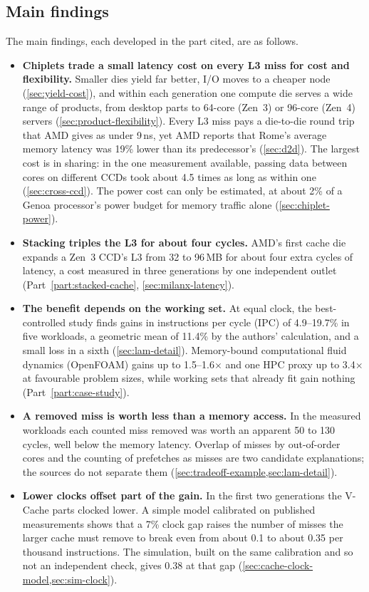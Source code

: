 \subsection{Main findings}
\label{sec:findings}
The main findings, each developed in the part cited, are as follows.
\begin{itemize}
  \item \textbf{Chiplets trade a small latency cost on every L3 miss for cost and flexibility.} Smaller dies yield far better, I/O moves to a cheaper node (\cref{sec:yield-cost}), and within each generation one compute die serves a wide range of products, from desktop parts to 64-core (Zen~3) or 96-core (Zen~4) servers (\cref{sec:product-flexibility}). Every L3 miss pays a die-to-die round trip that AMD gives as under 9\,ns, yet AMD reports that Rome's average memory latency was 19\% lower than its predecessor's (\cref{sec:d2d}). The largest cost is in sharing: in the one measurement available, passing data between cores on different CCDs took about 4.5 times as long as within one (\cref{sec:cross-ccd}). The power cost can only be estimated, at about 2\% of a Genoa processor's power budget for memory traffic alone (\cref{sec:chiplet-power}).
  \item \textbf{Stacking triples the L3 for about four cycles.} AMD's first cache die expands a Zen~3 CCD's L3 from 32 to 96\,MB for about four extra cycles of latency, a cost measured in three generations by one independent outlet (Part~\ref{part:stacked-cache}, \cref{sec:milanx-latency}).
  \item \textbf{The benefit depends on the working set.} At equal clock, the best-controlled study finds gains in instructions per cycle (IPC) of 4.9--19.7\% in five workloads, a geometric mean of 11.4\% by the authors' calculation, and a small loss in a sixth (\cref{sec:lam-detail}). Memory-bound computational fluid dynamics (OpenFOAM) gains up to 1.5--1.6$\times$ and one HPC proxy up to 3.4$\times$ at favourable problem sizes, while working sets that already fit gain nothing (Part~\ref{part:case-study}).
  \item \textbf{A removed miss is worth less than a memory access.} In the measured workloads each counted miss removed was worth an apparent 50 to 130 cycles, well below the memory latency. Overlap of misses by out-of-order cores and the counting of prefetches as misses are two candidate explanations; the sources do not separate them (\cref{sec:tradeoff-example,sec:lam-detail}).
  \item \textbf{Lower clocks offset part of the gain.} In the first two generations the V-Cache parts clocked lower. A simple model calibrated on published measurements shows that a 7\% clock gap raises the number of misses the larger cache must remove to break even from about 0.1 to about 0.35 per thousand instructions. The simulation, built on the same calibration and so not an independent check, gives 0.38 at that gap (\cref{sec:cache-clock-model,sec:sim-clock}).

\end{itemize}
